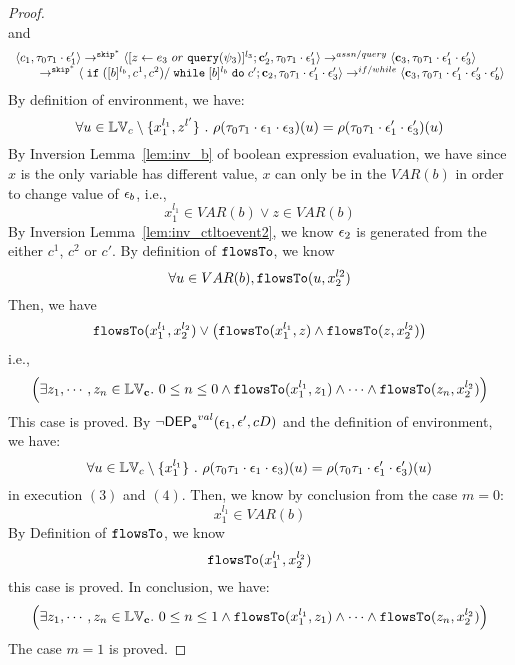 \begin{proof}
\[ \]
and 
 \[
  \begin{array}{l}   
  \langle c_1, \mathtt{\tau}_0 \mathtt{\tau}_1 \cdot \mathtt{\epsilon}_1' \rangle 
  \rightarrow^{\mathtt{skip}^*} 
  \langle [\mathrel{ z \leftarrow e_3~ or ~ {\tt query}(\psi_3) }]^{l_3}; {\boldsymbol{\mathbf{c}}}_2', 
  \mathtt{\tau}_0 \mathtt{\tau}_1 \cdot \mathtt{\epsilon}_1' \rangle 
  \rightarrow^{assn / query} 
  \langle {\boldsymbol{\mathbf{c}}}_3,  \mathtt{\tau}_0 \mathtt{\tau}_1 \cdot \mathtt{\epsilon}_1' \cdot \mathtt{\epsilon}_3' \rangle 
  \\ 
  \qquad \rightarrow^{\mathtt{skip}^*} 
  \langle \;\mathtt{if}\;([b]{}^{l_b}, c^1, c^2) / \;\mathtt{while}\; [b]{}^{l_b} \;\mathtt{do}\; c'; {\boldsymbol{\mathbf{c}}}_2, 
  \mathtt{\tau}_0 \mathtt{\tau}_1 \cdot \mathtt{\epsilon}_1' \cdot \mathtt{\epsilon}_3' \rangle 
  \rightarrow^{if / while} 
  \langle {\boldsymbol{\mathbf{c}}}_3,  \mathtt{\tau}_0 \mathtt{\tau}_1 \cdot \mathtt{\epsilon}_1' \cdot \mathtt{\epsilon}_3' \cdot \mathtt{\epsilon}_b' \rangle 
\end{array}
 \]
 By definition of environment, we have:
\[
  \forall u \in \mathbb{LV}_c \setminus \{x_1^{l_1}, z^{l'}\} ~.~
  \rho(\mathtt{\tau}_0 \mathtt{\tau}_1 \cdot \mathtt{\epsilon}_1 \cdot \mathtt{\epsilon}_3 ) (u) =  
  \rho(\mathtt{\tau}_0 \mathtt{\tau}_1 \cdot \mathtt{\epsilon}_1' \cdot \mathtt{\epsilon}_3') (u)
\]
%
By {Inversion Lemma~\ref{lem:inv_b}} of boolean expression evaluation, we have since $x$ is the only variable has different value, $x$ can only be in the $VAR(b)$ in order to change value of $\mathtt{\epsilon}_b$, i.e.,
 \[
  x_1^{l_1} \in VAR(b) \lor z \in VAR(b)
 \]
 By {Inversion Lemma~\ref{lem:inv_ctltoevent2}}, we know $\mathtt{\epsilon}_2$ is generated from the either $c^1$, $c^2$ or $c'$.
 By definition of $\mathtt{flowsTo}$, we know
 \[
 \forall u \in VAR(b), \mathtt{flowsTo}(u, x_2^{l2})
 \]
 Then, we have
 \[
  \mathtt{flowsTo}(x_1^{l_1}, x_2^{l_2}) \lor 
  \big(\mathtt{flowsTo}(x_1^{l_1}, z) \land \mathtt{flowsTo}(z, x_2^{l_2}) \big)
 \]
 i.e.,
 \[
 \Big( \exists z_1, \cdots, z_n \in \mathbb{LV}_{{\boldsymbol{\mathbf{c}}}}. ~ 0 \leq n \leq 0 \land
  \mathtt{flowsTo}(x_1^{l_1}, z_1) 
  \land \cdots \land \mathtt{flowsTo}(z_n, x_2^{l_2}) \Big)
 \]
 This case is proved.
%
%
By $\neg \mathsf{DEP_{\mathtt{e}}}^{val}(\mathtt{\epsilon}_1, \mathtt{\epsilon}', c D)$ and the definition of environment, we have:
\[
  \forall u \in \mathbb{LV}_c \setminus \{x_1^{l_1}\} ~.~
  \rho(\mathtt{\tau}_0 \mathtt{\tau}_1 \cdot \mathtt{\epsilon}_1 \cdot \mathtt{\epsilon}_3 ) (u) =  
  \rho(\mathtt{\tau}_0 \mathtt{\tau}_1 \cdot \mathtt{\epsilon}_1' \cdot \mathtt{\epsilon}_3') (u)
\]
in execution $(3)$ and $(4)$.
%
Then, we know by conclusion from the case $m = 0$:
\[
  x_1^{l_1} \in VAR(b)
\]
%
By Definition of $\mathtt{flowsTo}$, we know
\[
  \mathtt{flowsTo}(x_1^{l_1}, x_2^{l_2}) 
\]
this case is proved.
%
In conclusion, we have:
\[
  \Big( \exists z_1, \cdots, z_n \in \mathbb{LV}_{{\boldsymbol{\mathbf{c}}}}. ~ 0 \leq n \leq 1 \land
  \mathtt{flowsTo}(x_1^{l_1}, z_1) 
  \land \cdots \land \mathtt{flowsTo}(z_n, x_2^{l_2}) \Big)
\]
The case $m = 1$ is proved.
%

\end{proof}
